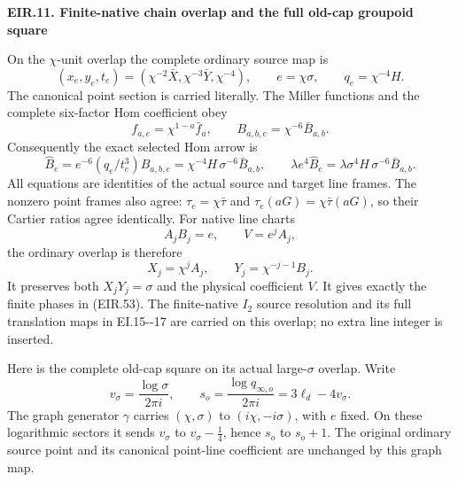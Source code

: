 \par

\medskip\noindent\textbf{EIR.11. Finite-native chain overlap and the full old-cap groupoid square}

\par\nobreak

On the \(\chi\)-unit overlap the complete ordinary source map is
\[
 (x_e,y_e,t_e)=(\chi^{-2}\bar X,\chi^{-3}\bar Y,\chi^{-4}),
 \qquad e=\chi\sigma,\qquad q_e=\chi^{-4}H .
 \tag{EIR.54}
\]
The canonical point section is carried literally. The Miller functions
and the complete six-factor Hom coefficient obey
\[
 f_{a,e}=\chi^{1-a}\bar f_a,\qquad
 B_{a,b,e}=\chi^{-6}\bar B_{a,b}.
\]
Consequently the exact selected Hom arrow is
\[
 \widehat B_e
   =e^{-6}(q_e/t_e^3)B_{a,b,e}
   =\chi^{-4}H\,\sigma^{-6}\bar B_{a,b},
 \qquad
 \lambda e^4\widehat B_e
   =\lambda\sigma^4H\,\sigma^{-6}\bar B_{a,b}.
 \tag{EIR.55}
\]
All equations are identities of the actual source and target line
frames. The nonzero point frames also agree:
\(\tau_e=\chi\bar\tau\) and
\(\tau_e(aG)=\chi\bar\tau(aG)\), so their Cartier ratios agree
identically. For native line charts
\[
 A_jB_j=e,\qquad V=e^jA_j,
\]
the ordinary overlap is therefore
\[
 X_j=\chi^jA_j,\qquad Y_j=\chi^{-j-1}B_j.
 \tag{EIR.56}
\]
It preserves both \(X_jY_j=\sigma\) and the physical coefficient
\(V\). It gives exactly the finite phases in (EIR.53). The
finite-native \(I_2\) source resolution and its full translation
maps in EI.15-\/-17 are carried on this overlap; no extra line
integer is inserted.

Here is the complete old-cap square on its actual large-\(\sigma\)
overlap. Write
\[
 v_\sigma=\frac{\log\sigma}{2\pi i},\qquad
 s_o=\frac{\log q_{\infty,o}}{2\pi i}
     =3\ell_d-4v_\sigma .
 \tag{EIR.57}
\]
The graph generator \(\gamma\) carries
\((\chi,\sigma)\) to \((i\chi,-i\sigma)\), with \(e\) fixed.
On these logarithmic sectors it sends
\(v_\sigma\) to \(v_\sigma-\tfrac14\), hence \(s_o\) to
\(s_o+1\). The original ordinary source point and its canonical
point-line coefficient are unchanged by this graph map.

